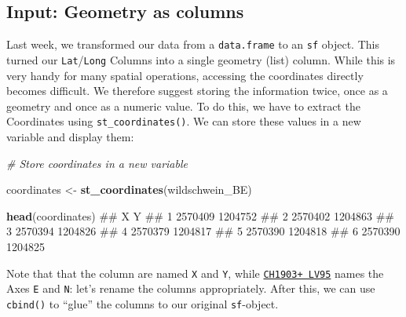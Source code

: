 \documentclass[]{book}
\newenvironment{Shaded}{\begin{snugshade}}{\end{snugshade}}
\newcommand{\KeywordTok}[1]{\textcolor[rgb]{0.13,0.29,0.53}{\textbf{#1}}}
\newcommand{\StringTok}[1]{\textcolor[rgb]{0.31,0.60,0.02}{#1}}
\newcommand{\CommentTok}[1]{\textcolor[rgb]{0.56,0.35,0.01}{\textit{#1}}}
\newcommand{\NormalTok}[1]{#1}
\begin{document}
\subsection{Input: Geometry as columns}\label{input-geometry-as-columns}

Last week, we transformed our data from a \texttt{data.frame} to an
\texttt{sf} object. This turned our \texttt{Lat}/\texttt{Long} Columns
into a single geometry (list) column. While this is very handy for many
spatial operations, accessing the coordinates directly becomes
difficult. We therefore suggest storing the information twice, once as a
geometry and once as a numeric value. To do this, we have to extract the
Coordinates using \texttt{st\_coordinates()}. We can store these values
in a new variable and display them:

\begin{Shaded}
\begin{Highlighting}[]
\CommentTok{# Store coordinates in a new variable}

\NormalTok{coordinates <-}\StringTok{ }\KeywordTok{st_coordinates}\NormalTok{(wildschwein_BE)}

\KeywordTok{head}\NormalTok{(coordinates)}
\NormalTok{##         X       Y}
\NormalTok{## 1 2570409 1204752}
\NormalTok{## 2 2570402 1204863}
\NormalTok{## 3 2570394 1204826}
\NormalTok{## 4 2570379 1204817}
\NormalTok{## 5 2570390 1204818}
\NormalTok{## 6 2570390 1204825}
\end{Highlighting}
\end{Shaded}

Note that that the column are named \texttt{X} and \texttt{Y}, while
\href{https://www.swisstopo.admin.ch/de/wissen-fakten/geodaesie-vermessung/neue-koordinaten.html}{\texttt{CH1903+\ LV95}}
names the Axes \texttt{E} and \texttt{N}: let's rename the columns
appropriately. After this, we can use \texttt{cbind()} to ``glue'' the
columns to our original \texttt{sf}-object.
\end{document}
